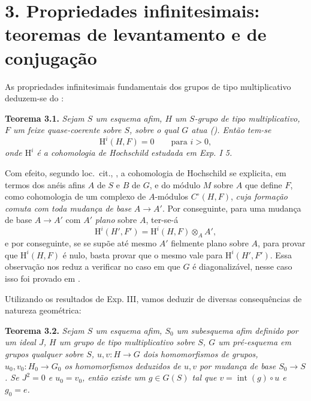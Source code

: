 
\section*{3. Propriedades infinitesimais:
teoremas de levantamento e de conjugação}

As propriedades infinitesimais fundamentais dos grupos de tipo
multiplicativo deduzem-se do
:

\medskip
\noindent{}\textbf{Teorema 3.1.}
\textit{Sejam \(S\) um esquema afim, \(H\) um \(S\)-grupo de tipo
multiplicativo, \(F\) um feixe quase-coerente sobre \(S\), sobre o
qual \(G\) atua ().
Então tem-se}
\[
  \mathrm H^i(H,F)=0\qquad\text{para }i>0,
\]
\textit{onde \(\mathrm H^i\) é a cohomologia de Hochschild estudada
em Exp. I 5.}

Com efeito, segundo loc.\ cit.,
, a cohomologia de Hochschild
se explicita, em termos dos anéis afins \(A\) de \(S\) e \(B\)
de \(G\), e do módulo \(M\) sobre \(A\) que define \(F\), como
cohomologia de um complexo de \(A\)-módulos \(C^\circ(H,F)\),
\emph{cuja formação comuta com toda mudança de base} \(A\to A'\).
Por conseguinte, para uma mudança de base \(A\to A'\) com \(A'\)
\emph{plano} sobre \(A\), ter-se-á
\[
  \mathrm H^i(H',F')=\mathrm H^i(H,F)\otimes_A A',
\]
e por conseguinte, se se supõe até mesmo \(A'\) fielmente plano
sobre \(A\), para provar que \(\mathrm H^i(H,F)\) é nulo, basta
provar que o mesmo vale para \(\mathrm H^i(H',F')\). Essa observação
nos reduz a verificar  no caso
em que \(G\) é diagonalizável, nesse caso isso foi provado em
.

Utilizando os resultados de Exp. III, vamos deduzir de
 diversas consequências de natureza
geométrica:

\medskip
\noindent{}\textbf{Teorema 3.2.}
\textit{Sejam \(S\) um esquema afim, \(S_0\) um subesquema afim
definido por um ideal \(J\), \(H\) um grupo de tipo multiplicativo
sobre \(S\), \(G\) um pré-esquema em grupos qualquer sobre \(S\),
\(u,v:H\to G\) dois homomorfismos de grupos, \(u_0,v_0:H_0\to G_0\)
os homomorfismos deduzidos de \(u,v\) por mudança de base
\(S_0\to S\). Se \(J^2=0\) e \(u_0=v_0\), então existe um
\(g\in G(S)\) tal que \(v=\operatorname{int}(g)\circ u\) e
\(g_0=e\).}

